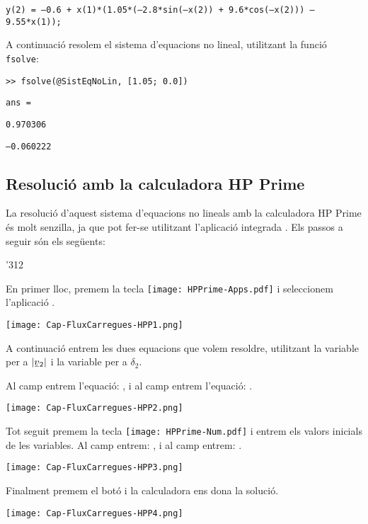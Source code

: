 \hspace{1cm}\texttt{y(2) = --0.6 + x(1)*(1.05*(--2.8*sin(--x(2)) + 9.6*cos(--x(2))) -- 9.55*x(1));}

A continuació resolem el sistema d'equacions no lineal, utilitzant la funció \texttt{fsolve}:

\hspace{1cm}\texttt{>{}> fsolve(@SistEqNoLin, [1.05; 0.0])}

\hspace{1cm}\texttt{ans =}

\hspace{1cm}\texttt{\phantom{ans --}0.970306}

\hspace{1cm}\texttt{\phantom{ans }--0.060222}

\subsection{Resolució amb la calculadora \textsf{HP Prime}}

La resolució d'aquest sistema d'equacions no lineals amb la calculadora \textsf{HP Prime} és molt senzilla, ja que pot fer-se utilitzant l'aplicació integrada . Els passos a seguir són els següents:

\begin{dingautolist}{'312}

    \item En primer lloc, premem la tecla \texttt{[image: HPPrime-Apps.pdf]} i seleccionem l'aplicació .

         \texttt{[image: Cap-FluxCarregues-HPP1.png]}

    \item A continuació entrem les dues equacions que volem resoldre, utilitzant la variable  per a $|\cmplx{v}_2|$ i la variable  per a $\delta_2$.

        Al camp  entrem l'equació: , i al camp  entrem l'equació: .

        \texttt{[image: Cap-FluxCarregues-HPP2.png]}

    \item Tot seguit premem la tecla \texttt{[image: HPPrime-Num.pdf]} i entrem els valors inicials de les variables. Al camp  entrem: , i al camp  entrem: .

        \texttt{[image: Cap-FluxCarregues-HPP3.png]}

    \item  Finalment premem el botó  i la calculadora ens dona  la solució.

        \texttt{[image: Cap-FluxCarregues-HPP4.png]}

\end{dingautolist}
